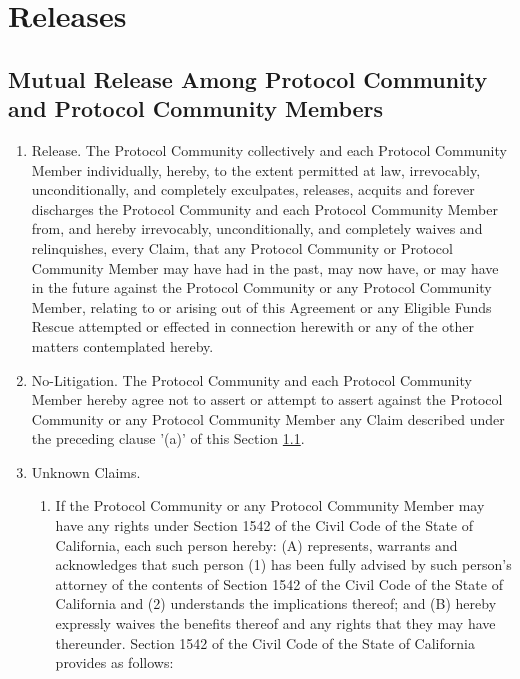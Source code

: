 \documentclass{article}
\begin{document}
\section{Releases}\label{sec:releases}

\subsection{Mutual Release Among Protocol Community and Protocol Community Members}\label{subsec:mutual_release}

\begin{enumerate}[label=\Alph*.]
    \item Release. The Protocol Community collectively and each Protocol Community Member individually, hereby, to the extent permitted at law, irrevocably, unconditionally, and completely exculpates, releases, acquits and forever discharges the Protocol Community and each Protocol Community Member from, and hereby irrevocably, unconditionally, and completely waives and relinquishes, every Claim, that any Protocol Community or Protocol Community Member may have had in the past, may now have, or may have in the future against the Protocol Community or any Protocol Community Member, relating to or arising out of this Agreement or any Eligible Funds Rescue attempted or effected in connection herewith or any of the other matters contemplated hereby.

    \item No-Litigation. The Protocol Community and each Protocol Community Member hereby agree not to assert or attempt to assert against the Protocol Community or any Protocol Community Member any Claim described under the preceding clause '(a)' of this Section \ref{subsec:mutual_release}.

    \item Unknown Claims.

          \begin{enumerate}
              \item If the Protocol Community or any Protocol Community Member may have any rights under Section 1542 of the Civil Code of the State of California, each such person hereby: (A) represents, warrants and acknowledges that such person (1) has been fully advised by such person's attorney of the contents of Section 1542 of the Civil Code of the State of California and (2) understands the implications thereof; and (B) hereby expressly waives the benefits thereof and any rights that they may have thereunder. Section 1542 of the Civil Code of the State of California provides as follows:


\end{enumerate}
\end{enumerate}
\end{document}
